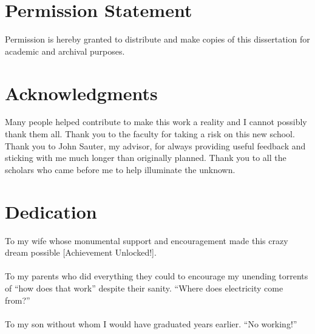 \section*{Permission Statement}
Permission is hereby granted to distribute and make copies of this dissertation for academic and archival purposes.

\section*{Acknowledgments}
Many people helped contribute to make this work a reality and I cannot possibly thank them all.  Thank you to the faculty for taking a risk on this new school.  Thank you to John Sauter, my advisor, for always providing useful feedback and sticking with me much longer than originally planned.  Thank you to all the scholars who came before me to help illuminate the unknown.

\section*{Dedication}
To my wife whose monumental support and encouragement made this crazy dream possible [Achievement Unlocked!].
\\ \\
To my parents who did everything they could to encourage my unending torrents of ``how does that work'' despite their sanity.  ``Where does electricity come from?''
\\ \\
To my son without whom I would have graduated years earlier.  ``No working!''

\newpage

